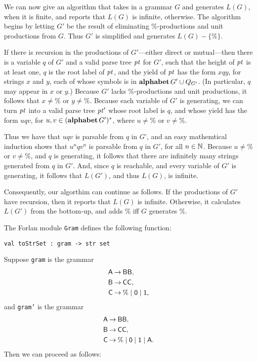 %
We can now give an algorithm that takes in a grammar $G$ and generates
$L(G)$, when it is finite, and reports that $L(G)$ is infinite,
otherwise. The algorithm begins by letting $G'$ be the result of
eliminating $\%$-productions and unit productions from $G$. Thus $G'$
is simplified and generates $L(G)-\{\%\}$.

If there is recursion in the productions of $G'$---either direct or
mutual---then there is a variable $q$ of $G'$ and a valid parse tree
${\it pt}$ for $G'$, such that the height of ${\it pt}$ is at least one, $q$ is
the root label of ${\it pt}$, and the yield of ${\it pt}$ has the form $xqy$,
for strings $x$ and $y$, each of whose symbols is in
$\mathbf{alphabet}\,G'\cup Q_{G'}$. (In particular, $q$ may appear in $x$ or
$y$.) Because $G'$ lacks $\%$-productions and unit productions, it
follows that $x\neq\%$ or $y\neq\%$. Because each variable of $G'$ is
generating, we can turn ${\it pt}$ into a valid parse tree ${\it pt}'$ whose
root label is $q$, and whose yield has the form $uqv$, for
$u,v\in(\mathbf{alphabet}\,G')^*$, where $u\neq\%$ or $v\neq\%$.

Thus we have that $uqv$ is parsable from $q$ in $G$', and an easy
mathemtical induction shows that $u^nqv^n$ is parsable from $q$ in
$G'$, for all $n\in\mathbb{N}$.  Because $u\neq\%$ or $v\neq\%$, and $q$ is
generating, it follows that there are infinitely many strings
generated from $q$ in $G'$. And, since $q$ is reachable, and every
variable of $G'$ is generating, it follows that $L(G')$, and thus
$L(G)$, is infinite.

Consequently, our algorthim can continue as follows. If the
productions of $G'$ have recursion, then it reports that $L(G)$ is
infinite.  Otherwise, it calculates $L(G')$ from the bottom-up, and
adds $\%$ iff $G$ generates $\%$.

The Forlan module \texttt{Gram} defines the following function:
\begin{verbatim}
val toStrSet : gram -> str set
\end{verbatim}
%
Suppose \texttt{gram} is the grammar
\begin{align*}
\mathsf{A} &\mathbin{\to} \mathsf{BB}, \\
\mathsf{B} &\mathbin{\to} \mathsf{CC}, \\
\mathsf{C} &\mathbin{\to} \% \mid \mathsf{0} \mid \mathsf{1} ,
\end{align*}
and
\texttt{gram'} is the grammar
\begin{align*}
\mathsf{A} &\mathbin{\to} \mathsf{BB}, \\
\mathsf{B} &\mathbin{\to} \mathsf{CC}, \\
\mathsf{C} &\mathbin{\to} \% \mid \mathsf{0} \mid \mathsf{1} \mid \mathsf{A} .
\end{align*}
Then we can proceed as follows:
  

